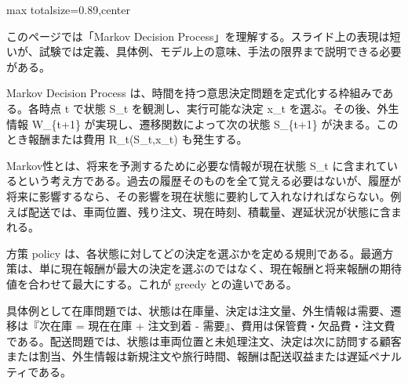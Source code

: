 \begin{minipage}[t]{0.58\textwidth}
\begin{adjustbox}{max totalsize={\textwidth}{0.89\textheight},center}
\begin{minipage}{\textwidth}\scriptsize
{}このページでは「Markov Decision Process」を理解する。スライド上の表現は短いが、試験では定義、具体例、モデル上の意味、手法の限界まで説明できる必要がある。\par
Markov Decision Process は、時間を持つ意思決定問題を定式化する枠組みである。各時点 t で状態 S\_t を観測し、実行可能な決定 x\_t を選ぶ。その後、外生情報 W\_\{t+1\} が実現し、遷移関数によって次の状態 S\_\{t+1\} が決まる。このとき報酬または費用 R\_t(S\_t,x\_t) も発生する。\par
Markov性とは、将来を予測するために必要な情報が現在状態 S\_t に含まれているという考え方である。過去の履歴そのものを全て覚える必要はないが、履歴が将来に影響するなら、その影響を現在状態に要約して入れなければならない。例えば配送では、車両位置、残り注文、現在時刻、積載量、遅延状況が状態に含まれる。\par
方策 policy は、各状態に対してどの決定を選ぶかを定める規則である。最適方策は、単に現在報酬が最大の決定を選ぶのではなく、現在報酬と将来報酬の期待値を合わせて最大にする。これが greedy との違いである。\par
具体例として在庫問題では、状態は在庫量、決定は注文量、外生情報は需要、遷移は『次在庫 = 現在在庫 + 注文到着 - 需要』、費用は保管費・欠品費・注文費である。配送問題では、状態は車両位置と未処理注文、決定は次に訪問する顧客または割当、外生情報は新規注文や旅行時間、報酬は配送収益または遅延ペナルティである。\par

\end{minipage}
\end{adjustbox}
\end{minipage}
